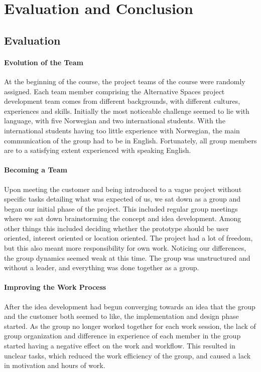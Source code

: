 \chapter{Evaluation and Conclusion}
\label{chap:Eval}

\section{Evaluation} 
\subsubsection{Evolution of the Team} At the beginning of the course, the project teams of the course were randomly assigned. Each team member comprising the Alternative Spaces project development team comes from different backgrounds, with different cultures, experiences and skills. Initially the most noticeable challenge seemed to lie with language, with five Norwegian and two international students. With the international students having too little experience with Norwegian, the main communication of the group had to be in English. Fortunately, all group members are to a satisfying extent experienced with speaking English.
\subsubsection{Becoming a Team} Upon meeting the customer and being introduced to a vague project without specific tasks detailing what was expected of us, we sat down as a group and began our initial phase of the project. This included regular group meetings where we sat down brainstorming the concept and idea development. Among other things this included deciding whether the prototype should be user oriented, interest oriented or location oriented. The project had a lot of freedom, but this also meant more responsibility for own work. Noticing our differences, the group dynamics seemed weak at this time. The group was unstructured and without a leader, and everything was done together as a group.
\subsubsection{Improving the Work Process} After the idea development had begun converging towards an idea that the group and the customer both seemed to like, the implementation and design phase started. As the group no longer worked together for each work session, the lack of group organization and difference in experience of each member in the group started having a negative effect on the work and workflow. This resulted in unclear tasks, which reduced the work efficiency of the group, and caused a lack in motivation and hours of work.
